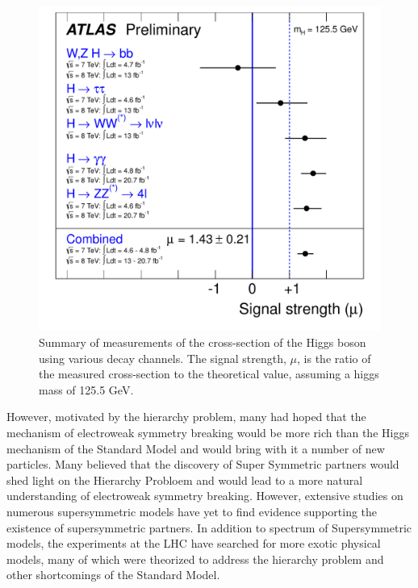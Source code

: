 \begin{figure}[ht!]
  \begin{center}
    \includegraphics[width=.75\textwidth]{figures/conclusion/HiggsCrossSection}
    \caption{Summary of measurements of the cross-section of the Higgs boson using various decay channels.
      The signal strength, $\mu$, is the ratio of the measured cross-section to the theoretical value, assuming a higgs mass of 125.5 GeV.}
    \label{fig:higgs_cross_section}
  \end{center}
\end{figure}
\clearpage

However, motivated by the hierarchy problem, many had hoped that the mechanism of electroweak
symmetry breaking would be more rich than the Higgs mechanism of the Standard Model and
would bring with it a number of new particles.
Many believed that the discovery of Super Symmetric partners would shed light on the
Hierarchy Probloem and would lead to a more natural understanding of electroweak symmetry breaking.
However, extensive studies on numerous supersymmetric models have yet to find evidence
supporting the existence of supersymmetric partners.
In addition to spectrum of Supersymmetric models, the experiments at the LHC have searched
for more exotic physical models, many of which were theorized to address the hierarchy
problem and other shortcomings of the Standard Model.

